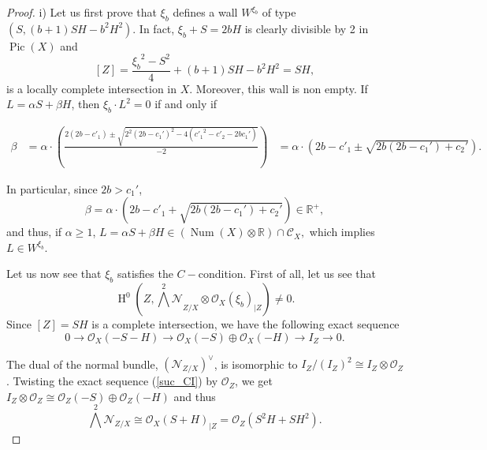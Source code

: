 \documentclass[11pt,twoside]{amsart}
\theoremstyle{definition}
\newcommand{\Pic}{\operatorname{Pic}}
\newcommand{\Num}{\operatorname{Num}}
\newcommand{\Ho}{\operatorname{H}}
\begin{document}
\begin{proof}
    


i) Let us first prove that $\xi_b$ defines a  wall $W^{\xi_b}$ of type $(S, (b+1)SH-b^2H^2)$. In fact,
 $\xi_b+S= 2bH$ is clearly divisible by 2 in $\Pic(X)$ and
  $$[Z]=\frac{{\xi_b}^2-S^2}{4}+(b+1)SH-b^2H^2=SH,$$  is a locally complete intersection in $X$.
Moreover,  this wall is non empty. If $L= \alpha S+\beta H$,  then $\xi_b\cdot L^2=0$ if and only if 


$\begin{array}{lll}
    \beta &=  \alpha\cdot\left(\frac{2(2b-c'_1)\pm\sqrt{2^2(2b-c_1')^2-4({c'_1}^2-c'_2-2bc_1')}}{-2}\right)
     & =\alpha\cdot \left( 2b-c'_1\pm\sqrt{2b(2b-c_1')+c_2'}\right).
\end{array}$
 
In particular, since $2b>c_1'$, $$\beta=\alpha\cdot \left( 2b-c'_1+\sqrt{2b(2b-c_1')+c_2'}\right)\in \mathbb{R}^+,$$ and thus, if $\alpha\geq1$, $L= \alpha S+ \beta H\in (\Num(X)\otimes \mathbb{R})\cap \mathcal{C}_X,$ which implies  $L\in W^{\xi_b}$.



Let us now see that $\xi_b$ satisfies the $C-$condition.
First of all, let us see that
$$\Ho^0(Z,{{\bigwedge}^2\mathcal{N}}_{Z/ X}\otimes \mathcal{O}_X(\xi_b)_{|Z})\neq0.$$ Since $[Z]=SH$ is a  complete intersection, we have the following exact sequence 
\begin{equation}
    \label{suc_CI}
    0\rightarrow  \mathcal{O}_X(-S-H)\rightarrow\mathcal{O}_X(-S)\oplus \mathcal{O}_X(-H)\rightarrow I_Z\rightarrow0.
\end{equation}

The dual of the normal bundle, $({\mathcal{N}}_{Z/ X})^\vee$, is isomorphic to $I_Z/(I_Z)^2\cong I_Z\otimes \mathcal{O}_Z$. Twisting the exact sequence (\ref{suc_CI}) by $\mathcal{O}_Z$, we get  $I_Z\otimes \mathcal{O}_Z\cong \mathcal{O}_Z(-S)\oplus\mathcal{O}_Z(-H)$ and thus
$${\bigwedge}^2{\mathcal{N}}_{Z/ X}\cong \mathcal{O}_X(S+H)_{|Z}= \mathcal{O}_Z(S^2H+SH^2).$$


\end{proof}
\end{document}
